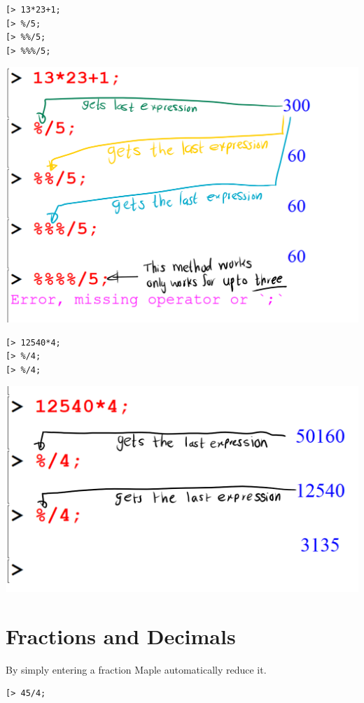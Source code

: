 \documentclass[
]{book}
\theoremstyle{definition}
\theoremstyle{definition}
\theoremstyle{definition}
\theoremstyle{definition}
\theoremstyle{remark}
\begin{document}
\begin{verbatim}
[> 13*23+1;
[> %/5;
[> %%/5;
[> %%%/5;
\end{verbatim}

\includegraphics{figures/Lesson 1/fig17.png}

\begin{verbatim}
[> 12540*4;
[> %/4;
[> %/4;
\end{verbatim}

\includegraphics{figures/Lesson 1/fig18.png}

\section{Fractions and Decimals}\label{fractions-and-decimals}

By simply entering a fraction Maple automatically reduce it.

\begin{verbatim}
[> 45/4;
\end{verbatim}
\end{document}
